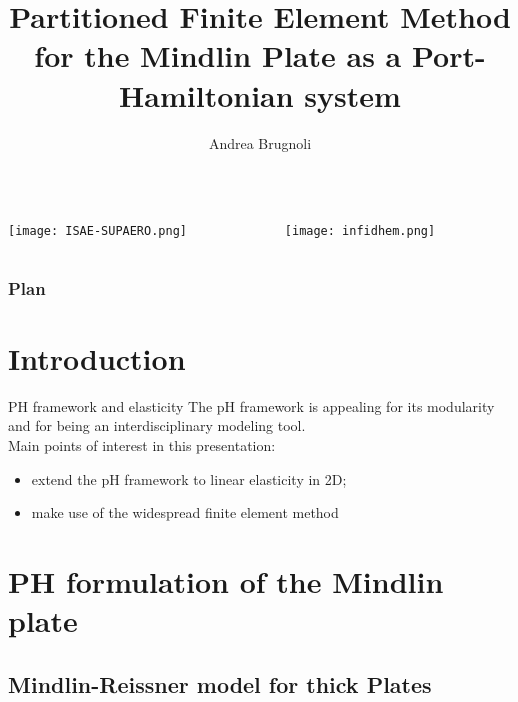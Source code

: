 \documentclass{beamer}
\title[CPDE Oaxaca 2019]{Partitioned Finite Element Method for the Mindlin Plate as a Port-Hamiltonian system}
\author[A. Brugnoli ISAE-SUPAERO]{\small Andrea Brugnoli}
\begin{document}
	
\nocite{*}
\begin{frame}
	\titlepage
	\begin{columns}
		\begin{column}{0.5\textwidth}
			\centering
			\texttt{[image: ISAE-SUPAERO.png]}
		\end{column}
		\begin{column}{0.5\textwidth}
			\centering
			\texttt{[image: infidhem.png]}
		\end{column}
	\end{columns}
\end{frame}

\begin{frame}
\frametitle{Plan}
\small
\tableofcontents
\normalsize
\end{frame}

\section{Introduction}

\begin{frame}{PH framework and elasticity}
The pH framework is appealing for its modularity and for being an interdisciplinary modeling tool. \\ 
Main points of interest in this presentation:
\begin{itemize}
\item extend the pH framework to linear elasticity in 2D;
\item make use of the widespread finite element method\,  \, 
\end{itemize}

\end{frame}

\section{PH formulation of the Mindlin plate}
\subsection{Mindlin-Reissner model for thick Plates}
\end{document}
